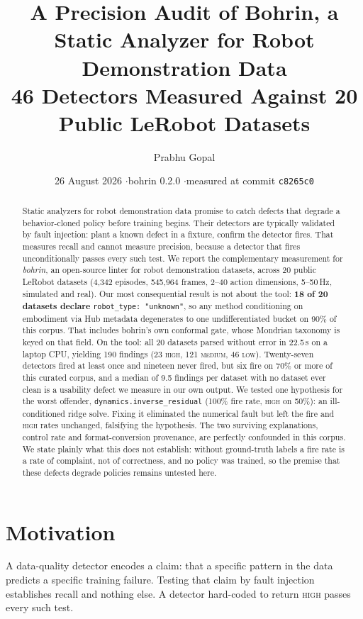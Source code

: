 \documentclass[10pt,a4paper]{article}
\title{\vspace{-2.2em}\textbf{A Precision Audit of Bohrin, a Static Analyzer for
Robot Demonstration Data}\\[0.35em]
\large 46 Detectors Measured Against 20 Public LeRobot Datasets}
\author{Prabhu Gopal}
\date{26 August 2026 \quad$\cdot$\quad bohrin 0.2.0 \quad$\cdot$\quad measured at commit \texttt{c8265c0}}
\newcommand{\dtr}[1]{\texttt{\small #1}}
\begin{document}
\maketitle

\begin{abstract}
\noindent
Static analyzers for robot demonstration data promise to catch defects that degrade a
behavior-cloned policy before training begins. Their detectors are typically validated by
fault injection: plant a known defect in a fixture, confirm the detector fires. That
measures recall and cannot measure precision, because a detector that fires unconditionally
passes every such test. We report the complementary measurement for \emph{bohrin}, an
open-source linter for robot demonstration datasets, across 20 public LeRobot datasets (4{,}342 episodes,
545{,}964 frames, 2--40 action dimensions, 5--50\,Hz, simulated and real).
Our most consequential result is not about the tool: \textbf{18 of 20 datasets declare}
\mbox{\texttt{robot\_type:\,"unknown"}}, so any method conditioning on embodiment via Hub
metadata degenerates to one undifferentiated bucket on 90\% of this corpus. That includes
bohrin's own conformal gate, whose Mondrian taxonomy is keyed on that field.
On the tool: all 20 datasets parsed without error in 22.5\,s on a laptop CPU, yielding 190
findings (23 \textsc{high}, 121 \textsc{medium}, 46 \textsc{low}). Twenty-seven detectors
fired at least once and nineteen never fired, but six fire on 70\% or more of this curated
corpus, and a median of 9.5 findings per dataset with no dataset ever clean is a usability
defect we measure in our own output. We tested one hypothesis for the worst offender,
\dtr{dynamics.inverse\_residual} (100\% fire rate, \textsc{high} on 50\%): an
ill-conditioned ridge solve. Fixing it eliminated the numerical fault but left the fire and
\textsc{high} rates unchanged, falsifying the hypothesis. The two surviving explanations,
control rate and format-conversion provenance, are perfectly confounded in this corpus. We
state plainly what this does not establish: without ground-truth labels a fire rate is a
rate of complaint, not of correctness, and no policy was trained, so the premise that these
defects degrade policies remains untested here.
\end{abstract}

\section{Motivation}

A data-quality detector encodes a claim: that a specific pattern in the data predicts a
specific training failure. Testing that claim by fault injection establishes recall and
nothing else. A detector hard-coded to return \textsc{high} passes every such test.
\end{document}
